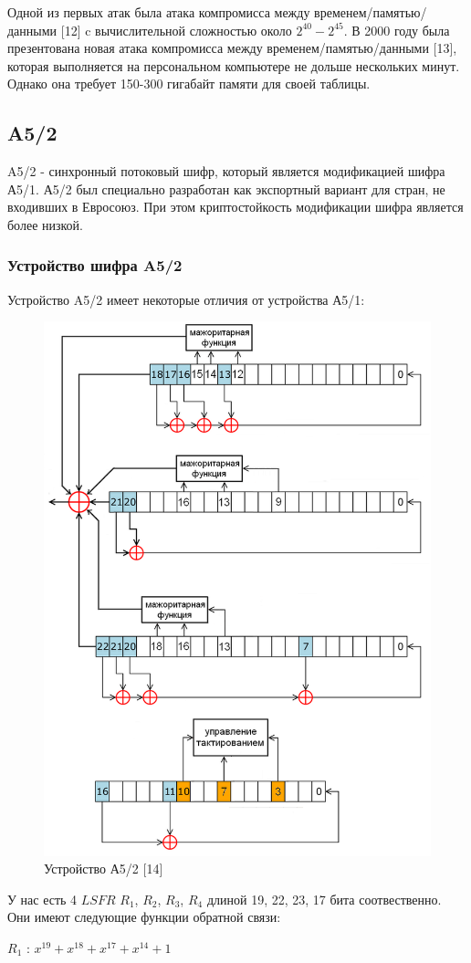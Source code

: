 \documentclass[colorthm]{./civarticle}
\begin{document}
Одной из первых атак была атака компромисса между временем/памятью/данными [12] c вычислительной сложностью около $2^{40}-2^{45}$. В 2000 году была презентована новая атака компромисса между временем/памятью/данными [13], которая выполняется на персональном компьютере не дольше нескольких минут. Однако она требует 150-300 гигабайт памяти для своей таблицы. 

\subsection{A5/2}

A5/2 - синхронный потоковый шифр, который является модификацией шифра А5/1. А5/2 был специально разработан как экспортный вариант для стран, не входивших в Евросоюз. При этом криптостойкость модификации шифра является более низкой.

\subsubsection{Устройство шифра A5/2}

Устройство A5/2 имеет некоторые отличия от устройства А5/1:

\begin{figure}[H]
    \centering
    \includegraphics[width=0.5\linewidth]{РСЛОСвA52.png}
    \caption{Устройство А5/2 [14]}
    \label{fig:enter-label}
\end{figure}

У нас есть 4 $LSFR$ $R_1$, $R_2$, $R_3$, $R_4$ длиной 19, 22, 23, 17 бита соотвественно. Они имеют следующие функции обратной связи:

$R_1$ : $x^{19} + x^{18} + x^{17} + x^{14} + 1$
\end{document}
